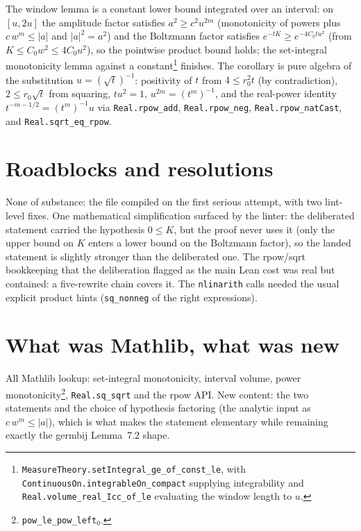 \documentclass[11pt]{article}
\begin{document}
The window lemma is a constant lower bound integrated over an interval: on
$[u, 2u]$ the amplitude factor satisfies $a^2 \geq c^2 u^{2m}$ (monotonicity
of powers plus $c\,w^m \leq |a|$ and $|a|^2 = a^2$) and the Boltzmann factor
satisfies $e^{-tK} \geq e^{-4 C_0 t u^2}$ (from $K \leq C_0 w^2 \leq
4 C_0 u^2$), so the pointwise product bound holds; the set-integral
monotonicity lemma against a constant\footnote{%
\texttt{MeasureTheory.setIntegral\_ge\_of\_const\_le}, with
\texttt{ContinuousOn.integrableOn\_compact} supplying integrability and
\texttt{Real.volume\_real\_Icc\_of\_le} evaluating the window length to $u$.}
finishes. The corollary is pure algebra of the substitution
$u = (\sqrt t)^{-1}$: positivity of $t$ from $4 \leq r_0^2 t$ (by
contradiction), $2 \leq r_0 \sqrt t$ from squaring, $t u^2 = 1$, $u^{2m} =
(t^m)^{-1}$, and the real-power identity $t^{-m - 1/2} = (t^m)^{-1} u$ via
\texttt{Real.rpow\_add}, \texttt{Real.rpow\_neg},
\texttt{Real.rpow\_natCast}, and \texttt{Real.sqrt\_eq\_rpow}.

\section{Roadblocks and resolutions}

None of substance: the file compiled on the first serious attempt, with two
lint-level fixes. One mathematical simplification surfaced by the linter: the
deliberated statement carried the hypothesis $0 \leq K$, but the proof never
uses it (only the upper bound on $K$ enters a lower bound on the Boltzmann
factor), so the landed statement is slightly stronger than the deliberated
one. The rpow/sqrt bookkeeping that the deliberation flagged as the main
Lean cost was real but contained: a five-rewrite chain covers it. The
\texttt{nlinarith} calls needed the usual explicit product hints
(\texttt{sq\_nonneg} of the right expressions).

\section{What was Mathlib, what was new}

All Mathlib lookup: set-integral monotonicity, interval volume, power monotonicity\footnote{\texttt{pow\_le\_pow\_left}$_0$.}, \texttt{Real.sq\_sqrt} and the
rpow API. New content: the two statements and the choice of hypothesis
factoring (the analytic input as $c\,w^m \leq |a|$), which is what makes the
statement elementary while remaining exactly the germbij Lemma~7.2 shape.
\end{document}
